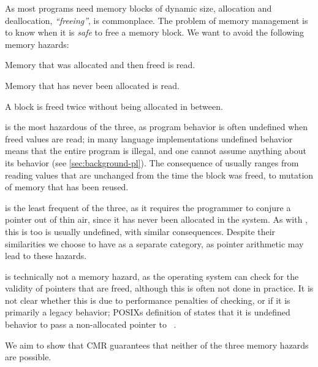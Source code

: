 As most programs need memory blocks of dynamic size, allocation and deallocation,
\emph{``freeing''}, is commonplace. The problem of memory management is to know when it is
\emph{safe} to free a memory block. We want to avoid the following memory hazards:

\begin{definition}
  Memory that was allocated and then freed is read.
\end{definition}

\begin{definition}
  Memory that has never been allocated is read.
\end{definition}

\begin{definition}
  A block is freed twice without being allocated in between.
\end{definition}


 is the most hazardous of the three, as program behavior is often undefined
when freed values are read; in many language implementations undefined behavior means that the
entire program is illegal, and one cannot assume anything about its behavior (see
\cref{sec:background-pl}). The consequence of  usually ranges from reading
values that are unchanged from the time the block was freed, to mutation of memory that has been
reused.

 is the least frequent of the three, as it requires the programmer to conjure a
pointer out of thin air, since it has never been allocated in the system. As with
, this is too is usually undefined, with similar consequences. Despite their
similarities we choose to have  as a separate category, as pointer arithmetic
may lead to these hazards.

 is technically not a memory hazard, as the operating system can check for the
validity of pointers that are freed, although this is often not done in practice. It is not clear
whether this is due to performance penalties of checking, or if it is primarily a legacy
behavior; POSIXs definition of  states that it is undefined behavior to pass a
non-allocated pointer to ~\cite{posix}.

We aim to show that CMR guarantees that neither of the three memory hazards are possible.


